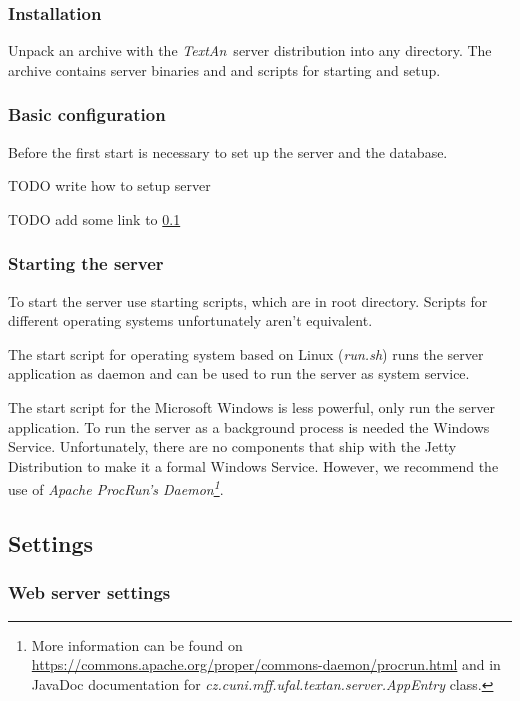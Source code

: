 \documentclass[12pt,a4paper]{report}
\newcommand{\textan}{\emph{TextAn}}
\begin{document}
\subsubsection{Installation}

Unpack an archive with the \textan\ server distribution into any directory. The archive contains server binaries and and scripts for starting and setup.

\subsubsection{Basic configuration}

Before the first start is necessary to set up the server and the database.

TODO write how to setup server

TODO add some link to \ref{sec:ServerSettings}

\subsubsection{Starting the server}

To start the server use starting scripts, which are in root directory. Scripts for different operating systems unfortunately aren't equivalent.

The start script for operating system based on Linux (\emph{run.sh}) runs the server application as daemon and can be used to run the server as system service.

The start script for the Microsoft Windows is less powerful, only run the server application. To run the server as a background process is needed the Windows Service. Unfortunately, there are no components that ship with the Jetty Distribution to make it a formal Windows Service. However, we recommend the use of \emph{Apache ProcRun's Daemon\footnote{More information can be found on \url{https://commons.apache.org/proper/commons-daemon/procrun.html} and in JavaDoc documentation for \emph{cz.cuni.mff.ufal.textan.server.AppEntry} class.}}.

\subsection{Settings}
\label{sec:ServerSettings}

\subsubsection{Web server settings}
\end{document}
